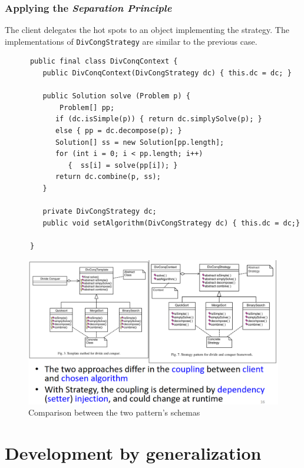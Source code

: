 \subsubsection{Applying the \textit{Separation Principle}}
   The client delegates the hot spots to an object implementing the strategy.
   The implementations of \lstinline|DivCongStrategy| are similar to the previous case.
   
   \begin{lstlisting}
      public final class DivConqContext {
         public DivConqContext(DivCongStrategy dc) { this.dc = dc; }
         
         public Solution solve (Problem p) {
             Problem[] pp;
            if (dc.isSimple(p)) { return dc.simplySolve(p); }
            else { pp = dc.decompose(p); }
            Solution[] ss = new Solution[pp.length];
            for (int i = 0; i < pp.length; i++)
               {  ss[i] = solve(pp[i]); }
            return dc.combine(p, ss);
         }
         
         private DivCongStrategy dc;
         public void setAlgorithm(DivCongStrategy dc) { this.dc = dc;}
      
      }
\end{lstlisting}

\begin{figure}[htbp]
   \centering
   \includegraphics{images/dp_comparison.png}
   \caption{Comparison between the two pattern's schemas}
   \label{fig:dp_comparison}
\end{figure}

\section{Development by generalization}

